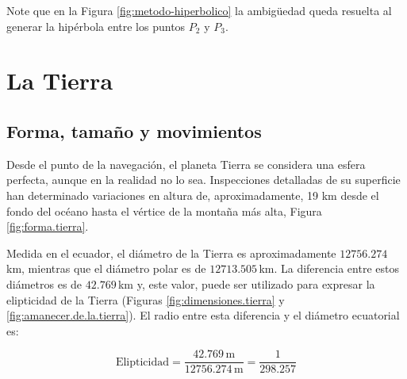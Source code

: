 \documentclass[a4paper,12pt,twoside]{article}
\begin{document}
Note que en la Figura  \ref{fig:metodo-hiperbolico} la ambigüedad queda resuelta al generar la hip\'erbola entre los puntos $P_2$ y $P_3$. 


\section{La Tierra}
\label{sec:la.tierra}

\subsection{Forma, tama\~no y movimientos}
\label{sec:forma.y.tamanio}

Desde el punto de la navegaci\'on, el planeta Tierra se considera una esfera perfecta, aunque en la realidad no lo sea. Inspecciones detalladas de su superficie han determinado variaciones en altura de, aproximadamente, 19 km desde el fondo del oc\'eano hasta el v\'ertice de la monta\~na m\'as alta, Figura \ref{fig:forma.tierra}.

Medida en el ecuador, el di\'ametro de la Tierra es aproximadamente $12756.274$\,km, mientras que el di\'ametro polar es de $12713.505$\,km. La diferencia entre estos di\'ametros es de $42.769$\,km y, este valor, puede ser utilizado para expresar la elipticidad de la Tierra (Figuras \ref{fig:dimensiones.tierra} y \ref{fig:amanecer.de.la.tierra}). El radio entre esta diferencia y el di\'ametro ecuatorial es:

\[\displaystyle
	\text{Elipticidad} = \frac{42.769 \,\text{m}}{ 12756.274\,\text{m}}
	=\frac{1}{298.257}
\]
\end{document}
